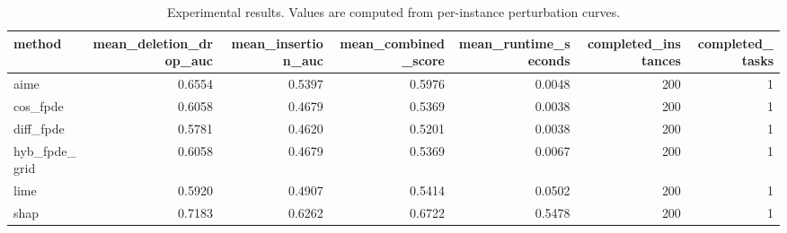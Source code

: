 \begin{table}[t]
\caption{Experimental results. Values are computed from per-instance perturbation curves.}
\label{tab:main_results_computed}
\centering
\begin{tabular}{lrrrrrr}
\toprule
method & mean\_deletion\_drop\_auc & mean\_insertion\_auc & mean\_combined\_score & mean\_runtime\_seconds & completed\_instances & completed\_tasks \\
\midrule
aime & 0.6554 & 0.5397 & 0.5976 & 0.0048 & 200 & 1 \\
cos\_fpde & 0.6058 & 0.4679 & 0.5369 & 0.0038 & 200 & 1 \\
diff\_fpde & 0.5781 & 0.4620 & 0.5201 & 0.0038 & 200 & 1 \\
hyb\_fpde\_grid & 0.6058 & 0.4679 & 0.5369 & 0.0067 & 200 & 1 \\
lime & 0.5920 & 0.4907 & 0.5414 & 0.0502 & 200 & 1 \\
shap & 0.7183 & 0.6262 & 0.6722 & 0.5478 & 200 & 1 \\
\bottomrule
\end{tabular}

\end{table}
